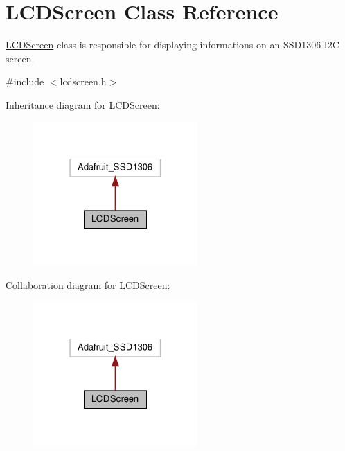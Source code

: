 \hypertarget{class_l_c_d_screen}{}\section{L\+C\+D\+Screen Class Reference}
\label{class_l_c_d_screen}


\hyperlink{class_l_c_d_screen}{L\+C\+D\+Screen} class is responsible for displaying informations on an S\+S\+D1306 I2C screen.  




{\ttfamily \#include $<$lcdscreen.\+h$>$}



Inheritance diagram for L\+C\+D\+Screen\+:\nopagebreak
\begin{figure}[H]
\begin{center}
\leavevmode
\includegraphics[width=178pt]{class_l_c_d_screen__inherit__graph}
\end{center}
\end{figure}


Collaboration diagram for L\+C\+D\+Screen\+:\nopagebreak
\begin{figure}[H]
\begin{center}
\leavevmode
\includegraphics[width=178pt]{class_l_c_d_screen__coll__graph}
\end{center}
\end{figure}

